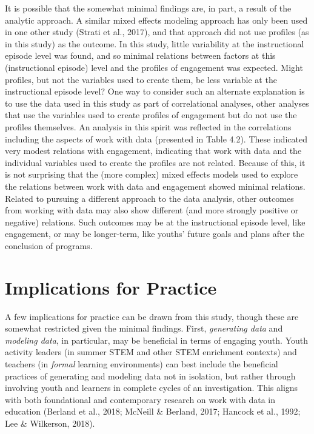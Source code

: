\documentclass[]{msu-thesis}
\theoremstyle{definition}
\theoremstyle{definition}
\theoremstyle{definition}
\theoremstyle{remark}
\begin{document}
It is possible that the somewhat minimal findings are, in part, a result
of the analytic approach. A similar mixed effects modeling approach has
only been used in one other study (Strati et al., 2017), and that
approach did not use profiles (as in this study) as the outcome. In this
study, little variability at the instructional episode level was found,
and so minimal relations between factors at this (instructional episode)
level and the profiles of engagement was expected. Might profiles, but
not the variables used to create them, be less variable at the
instructional episode level? One way to consider such an alternate
explanation is to use the data used in this study as part of
correlational analyses, other analyses that use the variables used to
create profiles of engagement but do not use the profiles themselves. An
analysis in this spirit was reflected in the correlations including the
aspects of work with data (presented in Table 4.2). These indicated very
modest relations with engagement, indicating that work with data and the
individual variables used to create the profiles are not related.
Because of this, it is not surprising that the (more complex) mixed
effects models used to explore the relations between work with data and
engagement showed minimal relations. Related to pursuing a different
approach to the data analysis, other outcomes from working with data may
also show different (and more strongly positive or negative) relations.
Such outcomes may be at the instructional episode level, like
engagement, or may be longer-term, like youths' future goals and plans
after the conclusion of programs.

\section{Implications for Practice}\label{implications-for-practice}

A few implications for practice can be drawn from this study, though
these are somewhat restricted given the minimal findings. First,
\emph{generating data} and \emph{modeling data}, in particular, may be
beneficial in terms of engaging youth. Youth activity leaders (in summer
STEM and other STEM enrichment contexts) and teachers (in \emph{formal}
learning environments) can best include the beneficial practices of
generating and modeling data not in isolation, but rather through
involving youth and learners in complete cycles of an investigation.
This aligns with both foundational and contemporary research on work
with data in education (Berland et al., 2018; McNeill \& Berland, 2017;
Hancock et al., 1992; Lee \& Wilkerson, 2018).
\end{document}
